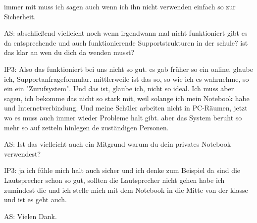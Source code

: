 \documentclass[fontsize=11pt,paper=a4]{scrbook}
\begin{document}
{\begin{itemize*}
immer mit muss ich sagen auch wenn ich
ihn nicht verwenden einfach so zur
Sicherheit.
\item[AS:] abschließend vielleicht noch wenn
irgendwann mal nicht funktioniert gibt
es da entsprechende und auch
funktionierende Supportstrukturen in
der schule? ist das klar an wen du dich da wenden
musst?
\item[IP3:] Also das funktioniert bei uns nicht so gut. 
es gab früher so ein online, glaube ich,
Supportanfrageformular.
mittlerweile ist das so, so wie ich es wahrnehme, so ein ein "Zurufsystem". Und das ist, glaube ich, nicht so ideal. Ich muss aber sagen, ich bekomme das nicht so stark mit, weil solange ich mein Notebook habe und Internetverbindung. Und meine Schüler arbeiten nicht in PC-Räumen,
jetzt wo es muss auch immer wieder
Probleme halt gibt. aber das System beruht so mehr so auf zetteln hinlegen
de zuständigen Personen.
\item[AS:] Ist das vielleicht auch
ein Mitgrund warum du dein privates
Notebook verwendest?
\item[IP3:] ja ich fühle mich
halt auch sicher und ich denke zum
Beispiel da sind die Lautsprecher schon
so gut, sollten die Lautsprecher nicht
gehen habe ich zumindest die und ich stelle mich mit dem Notebook in die Mitte von der klasse
und ist es geht auch.
\item[AS:] Vielen Dank.
\end{itemize*} 
}
\end{document}

